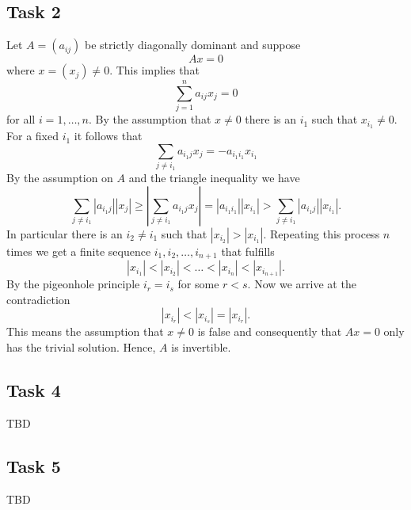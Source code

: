 \documentclass[a4paper,12pt]{article}
\begin{document}
\subsection*{Task 2}

Let \(A = (a_{ij})\) be strictly diagonally dominant and suppose
\[ Ax = 0 \]
where \(x = (x_j) \ne 0\).
This implies that
\[ \sum_{j=1}^n a_{ij} x_j = 0 \]
for all \(i = 1, \dots, n\).
By the assumption that \(x \ne 0\) there is an \(i_1\) such that
\(x_{i_1} \ne 0\).
For a fixed \(i_1\) it follows that
\[ \sum_{j \ne i_1} a_{i_1j} x_j = -a_{i_1i_1}x_{i_1} \]
By the assumption on \(A\) and the triangle inequality we have
\[
  \sum_{j \ne i_1} |a_{i_1j}| |x_j|
    \ge \left| \sum_{j \ne i_1} a_{i_1j} x_j \right|
    = |a_{i_1i_1}| |x_{i_1}|
    > \sum_{j \ne i_1} |a_{i_1j}| |x_{i_1}|.
\]
In particular there is an \(i_2 \ne i_1\) such that \(|x_{i_2}| > |x_{i_1}|\).
Repeating this process \(n\) times we get a finite sequence
\(i_1, i_2, \dots, i_{n+1}\) that fulfills
\[ |x_{i_1}| < |x_{i_2}| < \dots < |x_{i_n}| < |x_{i_{n+1}}|. \]
By the pigeonhole principle \(i_r = i_s\) for some \(r < s\).
Now we arrive at the contradiction
\[ |x_{i_r}| < |x_{i_s}| = |x_{i_r}|. \]
This means the assumption that \(x \ne 0\) is false and consequently that
\(Ax = 0\) only has the trivial solution.
Hence, \(A\) is invertible.


\subsection*{Task 4}

TBD


\subsection*{Task 5}

TBD
\end{document}
